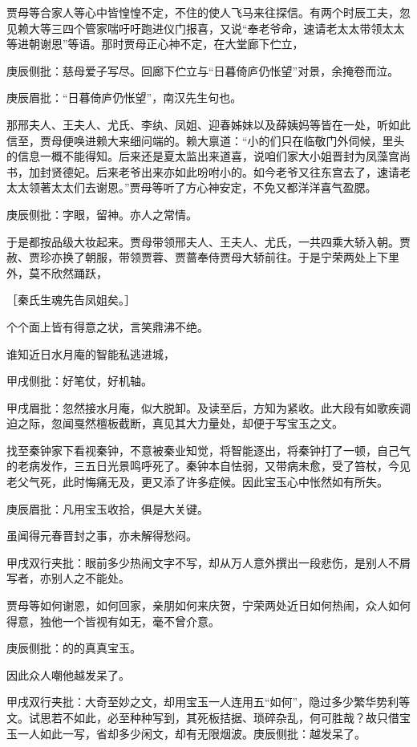 \begin{parag}


    贾母等合家人等心中皆惶惶不定，不住的使人飞马来往探信。有两个时辰工夫，忽见赖大等三四个管家喘吁吁跑进仪门报喜，又说“奉老爷命，速请老太太带领太太等进朝谢恩”等语。那时贾母正心神不定，在大堂廊下伫立，\begin{note}庚辰侧批：慈母爱子写尽。回廊下伫立与“日暮倚庐仍怅望”对景，余掩卷而泣。\end{note}\begin{note}庚辰眉批：“日暮倚庐仍怅望”，南汉先生句也。\end{note}那邢夫人、王夫人、尤氏、李纨、凤姐、迎春姊妹以及薛姨妈等皆在一处，听如此信至，贾母便唤进赖大来细问端的。赖大禀道：“小的们只在临敬门外伺候，里头的信息一概不能得知。后来还是夏太监出来道喜，说咱们家大小姐晋封为凤藻宫尚书，加封贤德妃。后来老爷出来亦如此吩咐小的。如今老爷又往东宫去了，速请老太太领著太太们去谢恩。”贾母等听了方心神安定，不免又都洋洋喜气盈腮。\begin{note}庚辰侧批：字眼，留神。亦人之常情。\end{note}于是都按品级大妆起来。贾母带领邢夫人、王夫人、尤氏，一共四乘大轿入朝。贾赦、贾珍亦换了朝服，带领贾蓉、贾蔷奉侍贾母大轿前往。于是宁荣两处上下里外，莫不欣然踊跃，\begin{note}［秦氏生魂先告凤姐矣。］\end{note}个个面上皆有得意之状，言笑鼎沸不绝。
\end{parag}


\begin{parag}


    谁知近日水月庵的智能私逃进城，\begin{note}甲戌侧批：好笔仗，好机轴。\end{note}\begin{note}甲戌眉批：忽然接水月庵，似大脱卸。及读至后，方知为紧收。此大段有如歌疾调迫之际，忽闻戛然檀板截断，真见其大力量处，却便于写宝玉之文。\end{note}找至秦钟家下看视秦钟，不意被秦业知觉，将智能逐出，将秦钟打了一顿，自己气的老病发作，三五日光景鸣呼死了。秦钟本自怯弱，又带病未愈，受了笞杖，今见老父气死，此时悔痛无及，更又添了许多症候。因此宝玉心中怅然如有所失。\begin{note}庚辰眉批：凡用宝玉收拾，俱是大关键。\end{note}虽闻得元春晋封之事，亦未解得愁闷。\begin{note}甲戌双行夹批：眼前多少热闹文字不写，却从万人意外撰出一段悲伤，是别人不屑写者，亦别人之不能处。\end{note}贾母等如何谢恩，如何回家，亲朋如何来庆贺，宁荣两处近日如何热闹，众人如何得意，独他一个皆视有如无，毫不曾介意。\begin{note}庚辰侧批：的的真真宝玉。\end{note}因此众人嘲他越发呆了。\begin{note}甲戌双行夹批：大奇至妙之文，却用宝玉一人连用五“如何”，隐过多少繁华势利等文。试思若不如此，必至种种写到，其死板拮据、琐碎杂乱，何可胜哉？故只借宝玉一人如此一写，省却多少闲文，却有无限烟波。庚辰侧批：越发呆了。\end{note}
\end{parag}


